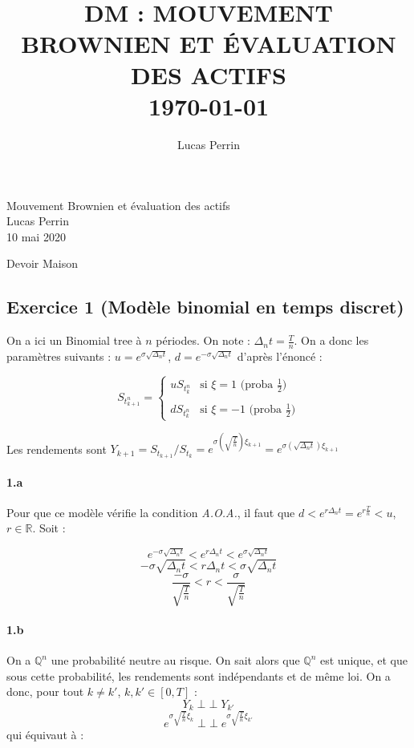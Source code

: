 \documentclass[a4paper,10pt]{report}
\title{ \normalsize \textsc{}    %
            \\[2.0cm]                               %
            \HRule{0.5pt} \\                        %
            \LARGE \textbf{\uppercase{DM : Mouvement Brownien et évaluation des actifs}}    %
            \HRule{2pt} \\ [0.5cm]      %
            \normalsize \today        %
            \\
        }
\author{
       Lucas Perrin\\
}
\DeclareMathOperator{\ind}{\perp \!\!\! \perp} %
\begin{document}
\setcounter{page}{1}
\noindent
Mouvement Brownien et évaluation des actifs\\
Lucas Perrin\\
10 mai 2020

\begin{center}
\huge{ Devoir Maison }
\end{center}


\subsection*{Exercice 1 (Modèle binomial en temps discret)}

On a ici un Binomial tree à $n$ périodes. On note : $\Delta_n t = \frac{T}{n}$. On a donc les paramètres suivants : $u = e^{\sigma \sqrt{\Delta_n t}}$, $d = e^{- \sigma \sqrt{\Delta_n t}}$ d'après l'énoncé :

$$
S_{t^n_{k+1}} = \left\{
\begin{array}{ll}
u S_{t^n_{k}} & \mbox{si } \xi = 1 \mbox{    (proba } \frac{1}{2} \mbox{)}\\
 & \\
d S_{t^n_{k}} & \mbox{si } \xi = -1 \mbox{    (proba } \frac{1}{2} \mbox{)}
    \end{array}
\right.
$$

Les rendements sont $Y_{k+1} = S_{t_{k+1}} / S_{t_{k}} = e^{\sigma \left( \sqrt{\frac{T}{n}} \right) \xi_{k+1}} = e^{\sigma \left( \sqrt{\Delta_n t} \right) \xi_{k+1}}$ 


\paragraph*{1.a} Pour que ce modèle vérifie la condition \textit{A.O.A.}, il faut que $d < e^{r \Delta_n t} = e^{r \frac{T}{n}} < u$, $r \in \mathbb{R}$. Soit :

$$
e^{- \sigma \sqrt{\Delta_n t}} < e^{r \Delta_n t} < e^{\sigma \sqrt{\Delta_n t}}
$$
$$
- \sigma \sqrt{\Delta_n t} < r \Delta_n t < \sigma \sqrt{\Delta_n t}
$$
$$
\frac{- \sigma}{\sqrt{\frac{T}{n}}} < r < \frac{\sigma}{\sqrt{\frac{T}{n}}}
$$


\paragraph*{1.b} On a $\mathbb{Q}^n$ une probabilité neutre au risque. On sait alors que $\mathbb{Q}^n$ est unique, et que sous cette probabilité, les rendements sont indépendants et de même loi. On a donc, pour tout $k \neq k'$, $k,k' \in [0,T]$ :
$$
Y_k \ind Y_{k'}
$$
$$
e^{\sigma \sqrt{\frac{T}{n}} \xi_{k}} \ind e^{\sigma \sqrt{\frac{T}{n}} \xi_{k'}}
$$
qui équivaut à :
\end{document}
